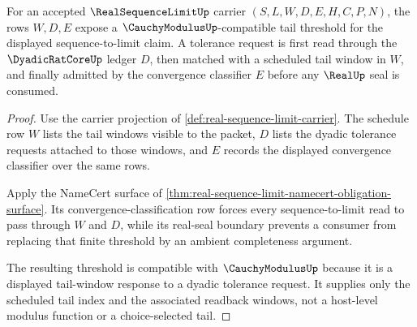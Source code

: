 \begin{theorem}\label{thm:real-sequence-limit-modulus-extraction}
For an accepted $\RealSequenceLimitUp$ carrier $(S,L,W,D,E,H,C,P,N)$, the rows $W,D,E$ expose a $\CauchyModulusUp$-compatible tail threshold for the displayed sequence-to-limit claim. A tolerance request is first read through the $\DyadicRatCoreUp$ ledger $D$, then matched with a scheduled tail window in $W$, and finally admitted by the convergence classifier $E$ before any $\RealUp$ seal is consumed.
\end{theorem}
\begin{proof}
Use the carrier projection of \autoref{def:real-sequence-limit-carrier}. The schedule row $W$ lists the tail windows visible to the packet, $D$ lists the dyadic tolerance requests attached to those windows, and $E$ records the displayed convergence classifier over the same rows.

Apply the NameCert surface of \autoref{thm:real-sequence-limit-namecert-obligation-surface}. Its convergence-classification row forces every sequence-to-limit read to pass through $W$ and $D$, while its real-seal boundary prevents a consumer from replacing that finite threshold by an ambient completeness argument.

The resulting threshold is compatible with $\CauchyModulusUp$ because it is a displayed tail-window response to a dyadic tolerance request. It supplies only the scheduled tail index and the associated readback windows, not a host-level modulus function or a choice-selected tail.
\end{proof}

